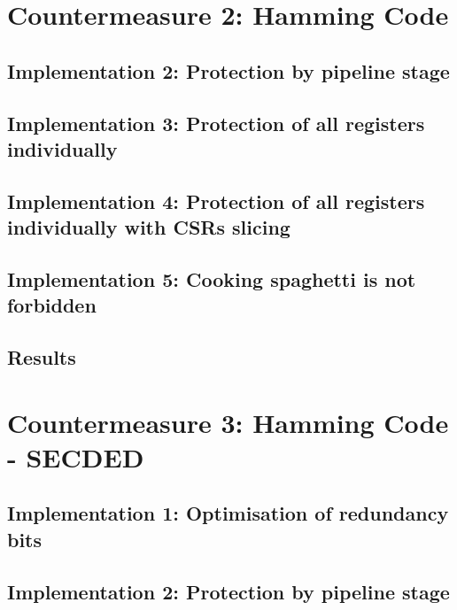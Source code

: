 
\section{Countermeasure 2: Hamming Code}
\label{section:chap6_hammingcode}

\subsection{Implementation 2: Protection by pipeline stage}

\subsection{Implementation 3: Protection of all registers individually}

\subsection{Implementation 4: Protection of all registers individually with CSRs slicing}

\subsection{Implementation 5: Cooking spaghetti is not forbidden}

\subsection{Results}

\section{Countermeasure 3: Hamming Code - SECDED}
\label{section:chap6_secded}

\subsection{Implementation 1: Optimisation of redundancy bits}

\subsection{Implementation 2: Protection by pipeline stage}

